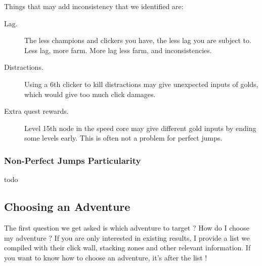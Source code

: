 \documentclass{article}
\begin{document}
Things that may add inconsistency that we identified are:
\begin{description}
    \item[Lag.]
    The less champions and clickers you have, the less lag you are subject to.
    Less lag, more farm.
    More lag less farm, and inconsistencies.
    \item[Distractions.] Using a 6th clicker to kill distractions may give unexpected inputs of golds, which would give too much click damages.
    \item[Extra quest rewards.] Level 15th node in the speed core may give different gold inputs by ending some levels early.
    This is often not a problem for perfect jumps.
\end{description}


\subsubsection{Non-Perfect Jumps Particularity}
\label{sec:nonPerfectJumps}

todo

\subsection{Choosing an Adventure}

The first question we get asked is which adventure to target ?
How do I choose my adventure ?
If you are only interested in existing results, I provide a list we compiled with their click wall, stacking zones and other relevant information.
If you want to know how to choose an adventure, it's after the list !
\end{document}
